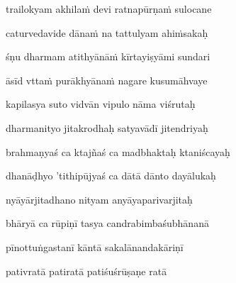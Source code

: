 trailokyam akhilaṁ devi ratnapūrṇaṁ sulocane \veg\dontdisplaylinenum
{}

caturvedavide dānaṁ na tattulyam ahiṁsakaḥ\thinspace{\dandab} \dontdisplaylinenum

śṇu dharmam atithyānāṁ kīrtayiṣyāmi sundari \veg\dontdisplaylinenum



āsīd vttaṁ purākhyānaṁ nagare kusumāhvaye\thinspace{\dandab} \dontdisplaylinenum

kapilasya suto vidvān vipulo nāma viśrutaḥ \veg\dontdisplaylinenum
{}

dharmanityo jitakrodhaḥ satyavādī jitendriyaḥ\thinspace{\dandab} \dontdisplaylinenum

brahmaṇyaś ca ktajñaś ca madbhaktaḥ ktaniścayaḥ \veg\dontdisplaylinenum
{}

dhanāḍhyo 'tithipūjyaś ca dātā dānto dayālukaḥ\thinspace{\dandab} \dontdisplaylinenum

nyāyārjitadhano nityam anyāyaparivarjitaḥ \veg\dontdisplaylinenum
{}

bhāryā ca rūpiṇī tasya candrabimbaśubhānanā\thinspace{\dandab} \dontdisplaylinenum

pīnottuṅgastanī kāntā sakalānandakāriṇī \danda\dontdisplaylinenum

pativratā patiratā patiśuśrūṣaṇe ratā \veg\dontdisplaylinenum
{}

